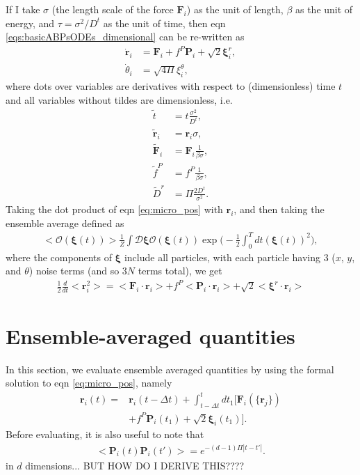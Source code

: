 \documentclass[twocolumn,amsmath,amssymb,aps]{revtex4-1}%
\begin{document}
If I take $\sigma$ (the length scale of the force $\bm{F}_i$) as the unit of
length, $\beta$ as the unit of energy, and $\tau = \sigma^2/D^t$ as the unit
of time, then eqn \ref{eqs:basicABPsODEs_dimensional} can be re-written as
\begin{subequations}
  \label{eqs:basicABPsODEs}
  \begin{align}
    \dot{\bm{r}}_i&=\bm{F}_i
    +f^P\bm{P}_i
    +\sqrt{2}\bm{\xi}^{r}_i,\label{eq:micro_pos}\\
    \dot\theta_i&=\sqrt{4\Pi}\xi^{\theta}_i,\label{eq:micro_theta}
  \end{align}
\end{subequations}
where dots over variables are derivatives with respect to (dimensionless)
time $t$ and all variables without tildes are dimensionless, i.e.
\begin{subequations}
  \label{eqs:dimensionless}
  \begin{align}
    \tilde{t} &= t\frac{\sigma^2}{D^t},\\
    \tilde{\bm{r}}_i &= \bm{r}_i\sigma,\\
    \tilde{\bm{F}}_i & = \bm{F}_i\frac{1}{\beta\sigma},\\
    \tilde{f}^P &= f^P\frac{1}{\beta\sigma},\\
    \tilde{D}^r &= \Pi \frac{2D^t}{\sigma^2}.
  \end{align}
\end{subequations}
Taking the dot product of eqn \ref{eq:micro_pos} with $\bm{r}_i$, and then
taking the ensemble average defined as
\begin{align}
  <\mathcal{O}(\bm{\xi}(t))>\frac{1}{Z}\int \mathcal{D}\bm{\xi}
  \mathcal{O}(\bm{\xi}(t))
  \exp\bigg(-\frac{1}{2}\int_0^Tdt(\bm{\xi}(t))^2\bigg),
\end{align}
where the components of $\bm{\xi}$ include all particles, with each particle
having $3$ ($x$, $y$, and $\theta$) noise terms (and so $3N$ terms total),
we get
\begin{align}
  \frac{1}{2}\frac{d}{dt}<\bm{r}_i^2>
  = <\bm{F}_i\cdot\bm{r}_i>+f^P<\bm{P}_i\cdot\bm{r}_i>
  +\sqrt{2}<\bm{\xi}^r\cdot\bm{r}_i>
\end{align}

\newpage
\appendix

\section{Ensemble-averaged quantities}

In this section, we evaluate ensemble averaged quantities by using the formal
solution to eqn \ref{eq:micro_pos}, namely
\begin{align}
  \bm{r}_i(t)=
  &\bm{r}_i(t-\Delta t)
  +\int_{t-\Delta t}^tdt_1[\bm{F}_i(\{\bm{r}_j\})\nonumber\\
    &+f^P\bm{P}_i(t_1)
    +\sqrt{2}\bm{\xi}_i(t_1)].
\end{align}
Before evaluating, it is also useful to note that
\begin{align}
  <\bm{P}_i(t)\bm{P}_i(t')> = e^{-(d-1)\Pi |t-t'|}.
\end{align}
in $d$ dimensions...
BUT HOW DO I DERIVE THIS????
\end{document}
